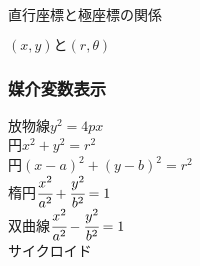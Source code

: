 \documentclass[10pt,dvipdfmx]{jsarticle}
\begin{document}
\begin{itembox}[l]{直行座標と極座標の関係}
  \begin{multicols}{2}
    \begin{minipage}{0.45\textwidth}
      $(x,y)と(r,\theta)$
    \end{minipage}
    \begin{minipage}{0.45\textwidth}
    \end{minipage}


  \end{multicols}
\end{itembox}

\subsubsection*{媒介変数表示}
\begin{multicols}{2}
  \begin{description}
    \item[放物線$y^2=4px$]\vspace{30mm}
    \item[円$x^2+y^2=r^2$]\vspace{30mm}
    \item[円$(x-a)^2+(y-b)^2=r^2$]\vspace{30mm}
    \item[楕円$\cfrac{x^2}{a^2}+\cfrac{y^2}{b^2}=1$]\vspace{30mm}
    \item[双曲線$\cfrac{x^2}{a^2}-\cfrac{y^2}{b^2}=1$]\vspace{30mm}
    \item[サイクロイド]\vspace{30mm}
  \end{description}
\end{multicols}



\newpage
\end{document}
